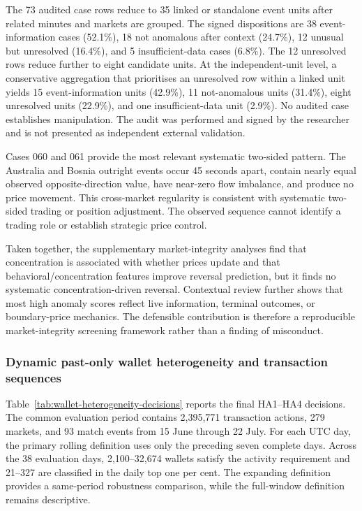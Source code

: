 The 73 audited case rows reduce to 35 linked or standalone event units after related
minutes and markets are grouped. The signed dispositions are 38
event-information cases (52.1\%), 18 not anomalous after context (24.7\%), 12 unusual
but unresolved (16.4\%), and 5 insufficient-data cases (6.8\%). The 12 unresolved
rows reduce further to eight candidate units. At the independent-unit level,
a conservative aggregation that prioritises an unresolved row within a linked
unit yields 15 event-information units (42.9\%), 11 not-anomalous units
(31.4\%), eight unresolved units (22.9\%), and one insufficient-data unit
(2.9\%). No audited case establishes
manipulation. The audit was performed and signed by the researcher and is not
presented as independent external validation.

Cases 060 and 061 provide the most relevant systematic two-sided pattern. The
Australia and Bosnia outright events occur 45 seconds apart, contain nearly
equal observed opposite-direction value, have near-zero flow imbalance, and
produce no price movement. This cross-market regularity is consistent with
systematic two-sided trading or position adjustment. The observed sequence
cannot identify a trading role or establish strategic price control.

Taken together, the supplementary market-integrity analyses find that concentration is associated with whether prices
update and that behavioral/concentration features improve reversal prediction,
but it finds no systematic concentration-driven reversal. Contextual review
further shows that most high anomaly scores reflect live information, terminal
outcomes, or boundary-price mechanics. The defensible contribution is therefore
a reproducible market-integrity screening framework rather than a finding of
misconduct.

\subsubsection{Dynamic past-only wallet heterogeneity and transaction sequences}
\label{sec:wallet-heterogeneity-results}

Table~\ref{tab:wallet-heterogeneity-decisions} reports the final HA1--HA4
decisions. The common evaluation period contains 2,395,771 transaction actions,
279 markets, and 93 match events from 15 June through 22 July. For each UTC
day, the primary rolling definition uses only the preceding seven complete
days. Across the 38 evaluation days, 2,100--32,674 wallets satisfy the activity
requirement and 21--327 are classified in the daily top one per cent. The
expanding definition provides a same-period robustness comparison, while the
full-window definition remains descriptive.

